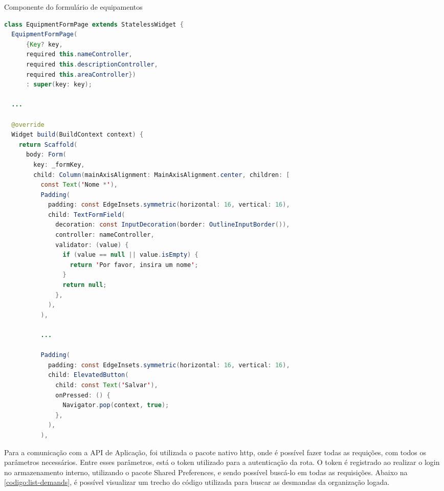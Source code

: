 \begin{sourcecode}[htb]
    \caption{\label{codigo:equip-form}Componente do formulário de equipamentos}
    \begin{lstlisting}[frame=single, language=Java]
class EquipmentFormPage extends StatelessWidget {
  EquipmentFormPage(
      {Key? key,
      required this.nameController,
      required this.descriptionController,
      required this.areaController})
      : super(key: key);

  ...

  @override
  Widget build(BuildContext context) {
    return Scaffold(
      body: Form(
        key: _formKey,
        child: Column(mainAxisAlignment: MainAxisAlignment.center, children: [
          const Text('Nome *'),
          Padding(
            padding: const EdgeInsets.symmetric(horizontal: 16, vertical: 16),
            child: TextFormField(
              decoration: const InputDecoration(border: OutlineInputBorder()),
              controller: nameController,
              validator: (value) {
                if (value == null || value.isEmpty) {
                  return 'Por favor, insira um nome';
                }
                return null;
              },
            ),
          ),
		  
          ...
		  
          Padding(
            padding: const EdgeInsets.symmetric(horizontal: 16, vertical: 16),
            child: ElevatedButton(
              child: const Text('Salvar'),
              onPressed: () {
                Navigator.pop(context, true);
              },
            ),
          ),

\end{lstlisting}
    \fonte{}
\end{sourcecode}

Para a comunicação com a API de Aplicação, foi utilizada o pacote nativo http, onde é possível fazer todas as requições, com todos os parâmetros necessários. Entre esses parâmetros, está o token utilizado para a autenticação da rota. O token é registrado ao realizar o login no armazenamento interno, utilizando o pacote Shared Preferences, e sendo possível buscá-lo em todas as requisições. Abaixo na \autoref{codigo:list-demands}, é possível visualizar um trecho do código utilizada para buscar as desmandas da organização logada.

